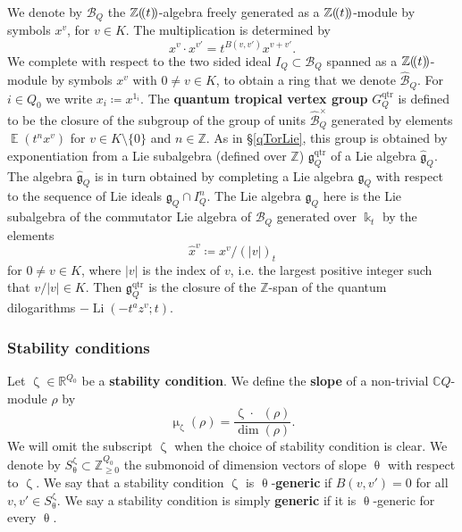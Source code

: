 \documentclass{amsart}
\DeclareMathOperator{\qtrop}{qtr}
\DeclareMathOperator{\EE}{\mathbb{E}}
\newcommand{\lcbs}{(\!(}
\newcommand{\rcbs}{)\!)}
\DeclareMathOperator{\Li}{Li}
\DeclareMathOperator{\udim}{\underline{\dim}}
\def\!{\mskip-\thinmuskip}
\let\bb=\mathbb
\let\f=\mathfrak
\newcommand {\kk} {\Bbbk}
\newcommand {\kt} {\kk_t}
\newcommand{\g}[1]{1_{#1}}
\renewcommand{\theta}{\uptheta}
\renewcommand{\zeta}{\upzeta}
\renewcommand{\mu}{\upmu}
\theoremstyle{plain}%
\theoremstyle{definition}
\theoremstyle{remark}
\begin{document}
We denote by $\mathscr{B}_Q$ the $\mathbb{Z}\lcbs t\rcbs$-algebra freely generated as a $\mathbb{Z}\lcbs t\rcbs$-module by symbols $x^{v}$, for $v\in K$.  The multiplication is determined by
\[
x^{v}\cdot x^{v'}=t^{B( v,v')}x^{v+v'}.
\]
We complete with respect to the two sided ideal $I_Q\subset \mathscr{B}_Q$ spanned as a $\mathbb{Z}\lcbs t\rcbs$-module by symbols $x^v$ with $0\neq v\in K$, to obtain a ring that we denote $\hat{\mathscr{B}}_Q$.  For $i\in Q_0$ we write $x_i\coloneqq x^{\g{i}}$.  The \textbf{quantum tropical vertex group} $G^{\qtrop}_Q$ is defined to be the closure of the subgroup of the group of units $\hat{\mathscr{B}}_Q^{\times}$ generated by elements $\EE(t^nx^v)$ for $v\in K\setminus \{0\}$ and $n\in\mathbb{Z}$.  As in \S \ref{qTorLie}, this group is obtained by exponentiation from a Lie subalgebra (defined over $\mathbb{Z}$) $\f{g}_Q^{\qtrop}$ of a Lie algebra $\hat{\mathfrak{g}}_{Q}$.  The algebra $\hat{\mathfrak{g}}_{Q}$ is in turn  obtained by completing a Lie algebra $\mathfrak{g}_{Q}$ with respect to the sequence of Lie ideals $\mathfrak{g}_{Q}\cap I_Q^n$.  The Lie algebra $\mathfrak{g}_{Q}$ here is the Lie subalgebra of the commutator Lie algebra of $\mathscr{B}_Q$ generated over $\kt$ by the elements 
\[
\hat{x}^v\coloneqq x^v/(\lvert v\lvert)_t
\]
for $0\neq v\in K$, where $\lvert v\lvert$ is the index of $v$, i.e. the largest positive integer such that $v/\lvert v\lvert\in K$.  Then $\f{g}_Q^{\qtrop}$ is the closure of the $\mathbb{Z}$-span of the quantum dilogarithms $-\Li(-t^az^v;t)$.


\subsubsection{Stability conditions}
Let $\zeta\in \mathbb{R}^{Q_0}$ be a  \textbf{stability condition}.  We define the \textbf{slope} of a non-trivial $\bb{C}Q$-module $\rho$ by
\[
\mu_{\zeta}(\rho)=\frac{\zeta\cdot\udim(\rho)}{\dim(\rho)}.
\]
We will omit the subscript $\zeta$ when the choice of stability condition is clear.  We denote by $S_{\theta}^{\zeta}\subset \bb{Z}_{\geq 0}^{Q_0}$ the submonoid of dimension vectors of slope $\theta$ with respect to $\zeta$.  We say that a stability condition $\zeta$ is $\theta$-\textbf{generic} if $B(v,v')=0$ for all $v,v'\in S_{\theta}^{\zeta}$.  We say a stability condition is simply \textbf{generic} if it is $\theta$-generic for every $\theta$.
\end{document}
